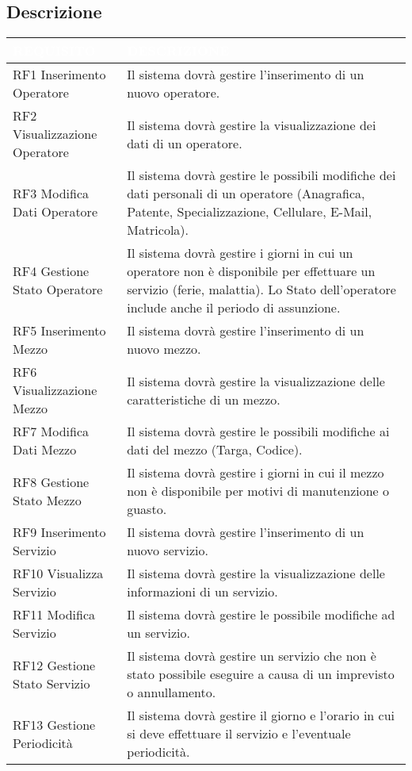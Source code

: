 \documentclass[green, fancy, 11pt]{elegantbook}
\begin{document}
\begin{center}
\section{Descrizione}
{
\small
{}
\begin{tabular}{|p{5cm}|p{10cm}|}
	\hline
	\rowcolor{DarkGreen}
	\textcolor{white}{REQUISITO} & \textcolor{white}{DESCRIZIONE}\\
	\hline
	RF1 Inserimento Operatore & Il sistema dovrà gestire l'inserimento di un nuovo operatore.\\
	\hline
	RF2 Visualizzazione Operatore & Il sistema dovrà gestire la visualizzazione dei dati di un operatore.\\
	\hline
	RF3 Modifica Dati Operatore & Il sistema dovrà gestire le possibili modifiche dei dati personali di un operatore (Anagrafica, Patente, Specializzazione, Cellulare, E-Mail, Matricola).\\
	\hline
	RF4 Gestione Stato Operatore & Il sistema dovrà gestire i giorni in cui un operatore non è disponibile per effettuare un servizio (ferie, malattia). Lo Stato dell'operatore include anche il periodo di assunzione.\\
	\hline
	RF5 Inserimento Mezzo & Il sistema dovrà gestire l'inserimento di un nuovo mezzo.\\
	\hline
	RF6 Visualizzazione Mezzo & Il sistema dovrà gestire la visualizzazione delle caratteristiche di un mezzo.\\
	\hline
	RF7 Modifica Dati Mezzo & Il sistema dovrà gestire le possibili modifiche ai dati del mezzo (Targa, Codice).\\
	\hline
	RF8 Gestione Stato Mezzo & Il sistema dovrà gestire i giorni in cui il mezzo non è disponibile per motivi di manutenzione o guasto.\\
	\hline
	RF9 Inserimento Servizio & Il sistema dovrà gestire l'inserimento di un nuovo servizio.\\
	\hline
	RF10 Visualizza Servizio & Il sistema dovrà gestire la visualizzazione delle informazioni di un servizio.\\
	\hline
	RF11 Modifica Servizio & Il sistema dovrà gestire le possibile modifiche ad un servizio.\\
	\hline
	RF12 Gestione Stato Servizio & Il sistema dovrà gestire un servizio che non è stato possibile eseguire a causa di un imprevisto o annullamento.\\
	\hline
	RF13 Gestione Periodicità & Il sistema dovrà gestire il giorno e l'orario in cui si deve effettuare il servizio e l'eventuale periodicità.\\

\end{tabular}}
\end{center}
\end{document}
